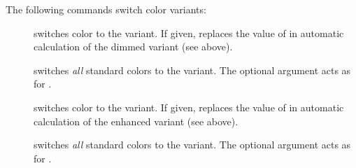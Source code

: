 \documentclass[12pt]{scrartcl}
\let\newslide=\relax
\begin{document}
  \newslide

  The following commands switch color variants:
  \begin{description}
  \item[]
     switches color  to the 
    variant. If given,  replaces the value of  in automatic calculation of the dimmed
    variant (see above).

  \item[]
     switches \emph{all} standard colors to the 
    variant. The optional argument  acts as for .

    \newslide

  \item[]
     switches color  to the
     variant. If given,  replaces the value of  in automatic
    calculation of the enhanced variant (see above).

  \item[]
     switches \emph{all} standard colors to the
     variant. The optional argument  acts as for .
  \end{description}

  \newslide
\end{document}
